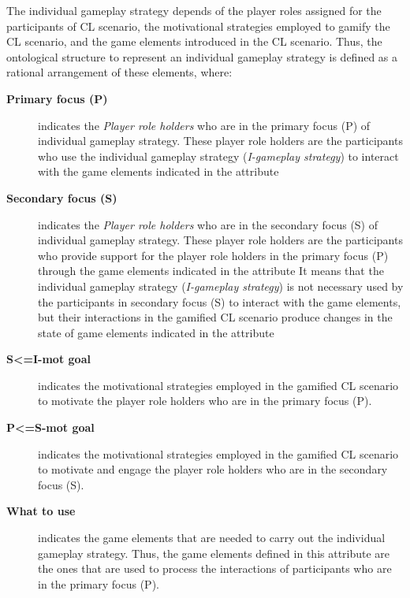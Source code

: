 The individual gameplay strategy depends of the player roles assigned for the participants of CL scenario, the motivational strategies employed to gamify the CL scenario, and the game elements introduced in the CL scenario. Thus, the ontological structure to represent an individual gameplay strategy is defined as a rational arrangement of these elements, where:

\begin{description}
\item [\textbf{Primary focus (P)}]
indicates the \emph{Player role holders} who are in the primary focus (P) of individual gameplay strategy. These player role holders are the participants who use the individual gameplay strategy (\emph{I-gameplay strategy}) to interact with the game elements indicated in the attribute 

\item [\textbf{Secondary focus (S)}]
indicates the \emph{Player role holders} who are in the secondary focus (S) of individual gameplay strategy. These player role holders are the participants who provide support for the player role holders in the primary focus (P) through the game elements indicated in the attribute  It means that the individual gameplay strategy (\emph{I-gameplay strategy}) is not necessary used by the participants in secondary focus (S) to interact with the game elements, but their interactions in the gamified CL scenario produce changes in the state of game elements indicated in the attribute 

\item[\textbf{S<=I-mot goal}]
indicates the motivational strategies employed in the gamified CL scenario to motivate the player role holders who are in the primary focus (P).

\item[\textbf{P<=S-mot goal}]
indicates the motivational strategies employed in the gamified CL scenario to motivate and engage the player role holders who are in the secondary focus (S).

\item[\textbf{What to use}]
indicates the game elements that are needed to carry out the individual gameplay strategy. Thus, the game elements defined in this attribute are the ones that are used to process the interactions of participants who are in the primary focus (P).
\end{description}


